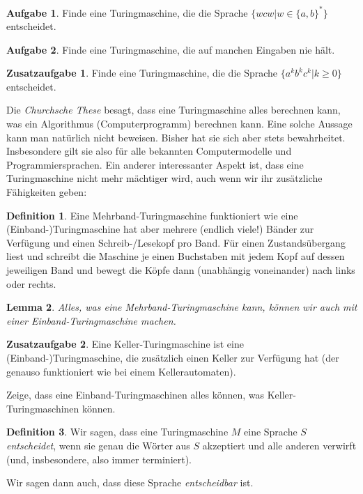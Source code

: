 \documentclass[a4paper,ngerman,12pt]{scrartcl}
\theoremstyle{definition}
\newtheorem{defn}{Definition}[]
\newtheorem{aufg}{Aufgabe}
\newtheorem{zaufg}{Zusatzaufgabe}
\theoremstyle{plain}
\newtheorem{lemma}[defn]{Lemma}
\theoremstyle{remark}
\begin{document}
\begin{aufg}
	Finde eine Turingmaschine, die die Sprache $\{wcw | w \in \{a,b\}^*\}$ entscheidet.
\end{aufg}

\begin{aufg}
	Finde eine Turingmaschine, die auf manchen Eingaben nie hält.
\end{aufg}

\begin{zaufg}
	Finde eine Turingmaschine, die die Sprache $\{a^kb^kc^k | k \geq 0\}$ entscheidet.
\end{zaufg}

Die \emph{Churchsche These} besagt, dass eine Turingmaschine alles berechnen kann, was ein Algorithmus (Computerprogramm) berechnen kann. Eine solche Aussage kann man natürlich nicht beweisen. Bisher hat sie sich aber stets bewahrheitet. Insbesondere gilt sie also für alle bekannten Computermodelle und Programmiersprachen. Ein anderer interessanter Aspekt ist, dass eine Turingmaschine nicht mehr mächtiger wird, auch wenn wir ihr zusätzliche Fähigkeiten geben:

\begin{defn}
	Eine Mehrband-Turingmaschine funktioniert wie eine (Einband-)Turingmaschine hat aber mehrere (endlich viele!) Bänder zur Verfügung und einen Schreib-/Lesekopf pro Band. Für einen Zustandsübergang liest und schreibt die Maschine je einen Buchstaben mit jedem Kopf auf dessen jeweiligen Band und bewegt die Köpfe dann (unabhängig voneinander) nach links oder rechts.
\end{defn}

\begin{lemma}
	Alles, was eine Mehrband-Turingmaschine kann, können wir auch mit einer Einband-Turingmaschine machen.
\end{lemma}

\begin{zaufg}
	Eine Keller-Turingmaschine ist eine (Einband-)Turingmaschine, die zusätzlich einen Keller zur Verfügung hat (der genauso funktioniert wie bei einem Kellerautomaten).
	
	Zeige, dass eine Einband-Turingmaschinen alles können, was Keller-Turingmaschinen können.
\end{zaufg}

\begin{defn}
	Wir sagen, dass eine Turingmaschine $M$ eine Sprache $S$ \emph{entscheidet}, wenn sie genau die Wörter aus $S$ akzeptiert und alle anderen verwirft (und, insbesondere, also immer terminiert).
	
	Wir sagen dann auch, dass diese Sprache \emph{entscheidbar} ist.
\end{defn}
\end{document}

